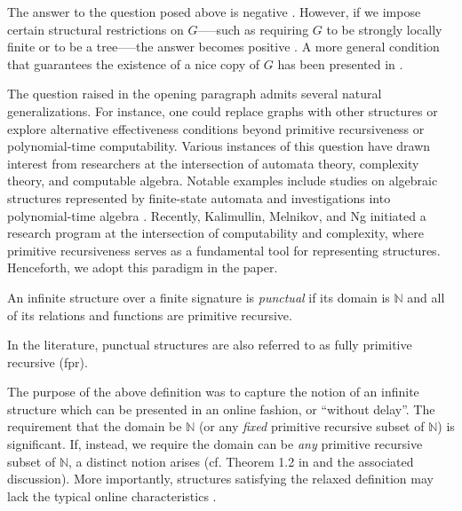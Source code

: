 \documentclass[a4paper,UKenglish,cleveref, autoref, thm-restate]{lipics-v2021}
\begin{document}
The answer to the question posed above is negative \cite{kalimullin_algebraic_2017}. However, if we impose certain structural restrictions on $G$—--such as requiring $G$ to be strongly locally finite or to be a tree—--the answer becomes positive \cite{cenzer_feasible_1998}. A more general condition that guarantees the existence of a nice copy of $G$ has been presented in \cite{kalocinski_punctual_2024}.

The question raised in the opening paragraph admits several natural generalizations. For instance, one could replace graphs with other structures or explore alternative effectiveness conditions beyond primitive recursiveness or polynomial-time computability. Various instances of this question have drawn interest from researchers at the intersection of automata theory, complexity theory, and computable algebra. Notable examples include studies on algebraic structures represented by finite-state automata \cite{khoussainov1994automatic,Blumensath-Gradel-00,Gradel-20} and investigations into polynomial-time algebra \cite{Nerode-Remmel-89,cenzer_polynomial_1991,alaev_polynomial_2018}. Recently, Kalimullin, Melnikov, and Ng \cite{kalimullin_algebraic_2017} initiated a research program at the intersection of computability and complexity, where primitive recursiveness serves as a fundamental tool for representing structures. Henceforth, we adopt this paradigm in the paper. 

\begin{definition}\label{def:punctual structure}
An infinite structure over a finite signature is \emph{punctual} if its domain is $\mathbb N$ and all of its relations and functions are primitive recursive.
\end{definition}
In the literature, punctual structures are also referred to as fully primitive recursive (fpr).

The purpose of the above definition was to capture the notion of an infinite structure which can be presented in an online fashion, or ``without delay''. The requirement that the domain be $\mathbb{N}$ (or any \emph{fixed} primitive recursive subset of $\mathbb N$) is significant. If, instead, we require the domain can be \emph{any} primitive recursive subset of $\mathbb N$, a distinct notion arises (cf. Theorem 1.2 in \cite{cenzer_polynomial_1991} and the associated discussion). More importantly, structures satisfying the relaxed definition may lack the typical online characteristics \cite{kalimullin_algebraic_2017,bazhenov_foundations_2019}.
\end{document}
